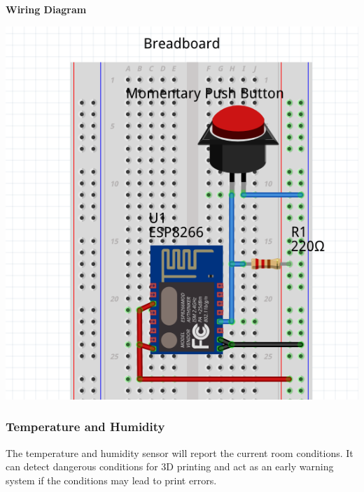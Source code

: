       \textbf{Wiring Diagram}\\
            \begin{center}
      \includegraphics[scale=0.25]{images/job-cir.png}
      \end{center}
    \subsubsection{Temperature and Humidity}
      The temperature and humidity sensor will report the current room conditions. It
      can detect dangerous conditions for 3D printing and act as an early warning system
      if the conditions may lead to print errors.\\

